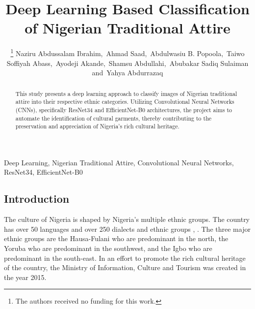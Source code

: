 \documentclass[
  journal,
]{IEEEtran}%
\title{Deep Learning Based Classification of Nigerian Traditional
Attire}
\author{
\thanks{The authors received no funding for this work.}
Naziru Abdussalam Ibrahim\orcidlink{0000-0002-1825-0097},~Ahmad
Saad\orcidlink{0000-0002-1825-0097},~Abdulwasiu B.
Popoola\orcidlink{0009-0000-9742-777X},~Taiwo Soffiyah
Abass\orcidlink{0000-0002-1825-0097},~Ayodeji
Akande\orcidlink{0000-0002-1825-0097},~Shamsu
Abdullahi\orcidlink{0000-0002-1825-0097},~Abubakar Sadiq
Sulaiman\orcidlink{0000-0002-1825-0097}
and~Yahya Abdurrazaq\orcidlink{0000-0002-1825-0097}%
}
\begin{document}


\maketitle

\begin{abstract}
This study presents a deep learning approach to classify images of
Nigerian traditional attire into their respective ethnic categories.
Utilizing Convolutional Neural Networks (CNNs), specifically ResNet34
and EfficientNet-B0 architectures, the project aims to automate the
identification of cultural garments, thereby contributing to the
preservation and appreciation of Nigeria's rich cultural heritage.
\end{abstract}
\begin{IEEEkeywords}
Deep Learning, Nigerian Traditional Attire, Convolutional Neural
Networks, ResNet34, EfficientNet-B0
\end{IEEEkeywords}

%


\subsection{Introduction}\label{introduction}

The culture of Nigeria is shaped by Nigeria's multiple ethnic groups.
The country has over 50 languages and over 250 dialects and ethnic
groups ,
. The three major ethnic groups are the Hausa-Fulani who are predominant
in the north, the Yoruba who are predominant in the southwest, and the
Igbo who are predominant in the south-east. In an effort to promote the
rich cultural heritage of the country, the Ministry of Information,
Culture and Tourism was created in the year 2015.
\end{document}
